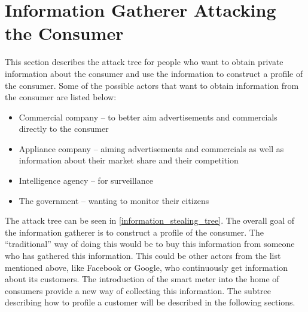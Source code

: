 \section{Information Gatherer Attacking the Consumer}\label{informationGathererVsConsumer}
This section describes the attack tree for people who want to obtain private information about the consumer and use the information to construct a profile of the consumer.
Some of the possible actors that want to obtain information from the consumer are listed below:
\begin{itemize}
\item Commercial company -- to better aim advertisements and commercials directly to the consumer
\item Appliance company -- aiming advertisements and commercials as well as information about their market share and their competition
\item Intelligence agency -- for surveillance
\item The government -- wanting to monitor their citizens
\end{itemize}

The attack tree can be seen in \cref{information_stealing_tree}.
The overall goal of the information gatherer is to construct a profile of the consumer.
The ``traditional'' way of doing this would be to buy this information from someone who has gathered this information.
This could be other actors from the list mentioned above, like Facebook or Google, who continuously get information about its customers.
The introduction of the smart meter into the home of consumers provide a new way of collecting this information.
The subtree describing how to profile a customer will be described in the following sections.



